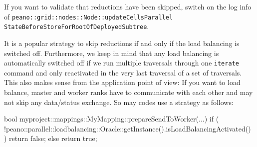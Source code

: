   
\begin{remark}
  If you want to validate that reductions have been skipped, switch on the log
  info of 
  \texttt{peano::grid::nodes::Node::updateCellsParallel}
  \texttt{StateBeforeStoreForRootOfDeployedSubtree}.
\end{remark}

\noindent
It is a popular strategy to skip reductions if and only if the load balancing is
switched off.
Furthermore, we keep in mind that any load balancing is automatically
switched off if we run multiple traversals through one \texttt{iterate} command
and only reactivated in the very last traversal of a set of traversals.
This also makes sense from the application point of view:
If you want to load balance, master and worker ranks have to communicate with
each other and may not skip any data/status exchange.
So may codes use a strategy as follows:

\begin{code}
bool myproject::mappings::MyMapping::prepareSendToWorker(...) {
  if (
    !peano::parallel::loadbalancing::Oracle::getInstance().isLoadBalancingActivated()
  ) {
    return false;
  }
  else return true;
}
\end{code}
